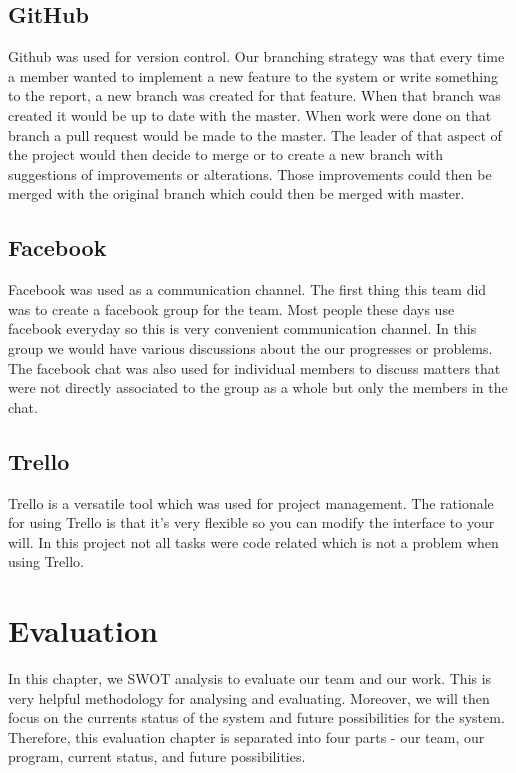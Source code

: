 \documentclass[11pt]{article}
\begin{document}
\subsection{GitHub}
Github was used for version control. Our branching strategy was that every time a member wanted to implement a new feature to the system or write something to the report, a new branch was created for that feature. When that branch was created it would be up to date with the master. When work were done on that branch a pull request would be made to the master. The leader of that aspect of the project would then decide to merge or to create a new branch with suggestions of improvements or alterations. Those improvements could then be merged with the original branch which could then be merged with master.
\subsection{Facebook}
Facebook was used as a communication channel. The first thing this team did was to create a facebook group for the team. Most people these days use facebook everyday so this is very convenient communication channel. In this group we would have various discussions about the our progresses or problems. The facebook chat was also used for individual members to discuss matters that were not directly associated to the group as a whole but only the members in the chat.
\subsection{Trello}
Trello is a versatile tool which was used for project management. The rationale for using Trello is that it's very flexible so you can modify the interface to your will. In this project not all tasks were code related which is not a problem when using Trello. 


\newpage
\section{Evaluation}
In this chapter, we SWOT analysis to evaluate our team and our work. This is very helpful methodology for analysing and evaluating. Moreover, we will then focus on the currents status of the system and future possibilities for the system. Therefore, this evaluation chapter is separated into four parts - our team, our program, current status, and future possibilities.
\end{document}
